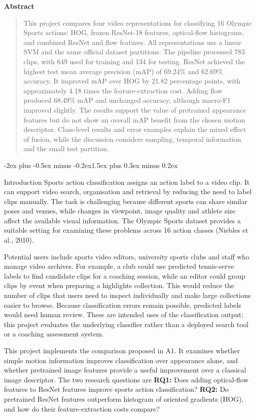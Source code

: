 \documentclass[10pt,letterpaper]{article}
\makeatletter
\renewcommand{\section}{\@startsection{section}{1}{0pt}%
  {-2ex plus -0.5ex minus -0.2ex}{1.5ex plus 0.3ex minus 0.2ex}%
  {\large\bfseries\raggedright}}
\renewenvironment{abstract}{%
  \begin{center}\large\bfseries Abstract\end{center}
  \begin{quote}}{\end{quote}\vspace{1ex}}
\makeatother
\begin{document}
\clearpage
\begin{abstract}
This project compares four video representations for classifying 16 Olympic Sports actions: HOG, frozen ResNet-18 features, optical-flow histograms, and combined ResNet and flow features. All representations use a linear SVM and the same official dataset partitions. The pipeline processed 783 clips, with 649 used for training and 134 for testing. ResNet achieved the highest test mean average precision (mAP) of 69.24\% and 62.69\% accuracy. It improved mAP over HOG by 21.82 percentage points, with approximately 4.18 times the feature-extraction cost. Adding flow produced 68.49\% mAP and unchanged accuracy, although macro-F1 improved slightly. The results support the value of pretrained appearance features but do not show an overall mAP benefit from the chosen motion descriptor. Class-level results and error examples explain the mixed effect of fusion, while the discussion considers sampling, temporal information and the small test partition.
\end{abstract}
\section{Introduction}
Sports action classification assigns an action label to a video clip. It can support video search, organisation and retrieval by reducing the need to label clips manually. The task is challenging because different sports can share similar poses and venues, while changes in viewpoint, image quality and athlete size affect the available visual information. The Olympic Sports dataset provides a suitable setting for examining these problems across 16 action classes (Niebles et al., 2010).

Potential users include sports video editors, university sports clubs and staff who manage video archives. For example, a club could use predicted tennis-serve labels to find candidate clips for a coaching session, while an editor could group clips by event when preparing a highlights collection. This would reduce the number of clips that users need to inspect individually and make large collections easier to browse. Because classification errors remain possible, predicted labels would need human review. These are intended uses of the classification output; this project evaluates the underlying classifier rather than a deployed search tool or a coaching assessment system.

This project implements the comparison proposed in A1. It examines whether simple motion information improves classification over appearance alone, and whether pretrained image features provide a useful improvement over a classical image descriptor. The two research questions are \textbf{RQ1:} Does adding optical-flow features to ResNet features improve sports action classification? \textbf{RQ2:} Do pretrained ResNet features outperform histogram of oriented gradients (HOG), and how do their feature-extraction costs compare?
\end{document}
